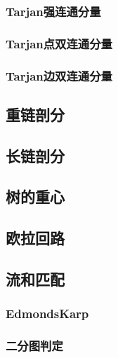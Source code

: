 \subsubsection{Tarjan强连通分量}


\subsubsection{Tarjan点双连通分量}


\subsubsection{Tarjan边双连通分量}


\subsection{重链剖分}


\subsection{长链剖分}

\subsection{树的重心}


\subsection{欧拉回路}

\subsection{流和匹配}
\subsubsection{EdmondsKarp}


\subsubsection{二分图判定}


